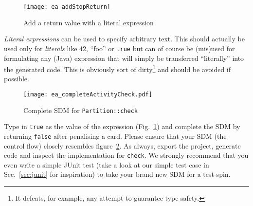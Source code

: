 \begin{figure}[htbp]
\begin{center}
  \texttt{[image: ea\_addStopReturn]}
  \caption{Add a return value with a literal expression}
  \label{fig:sdm_check_literal_exp}
\end{center}
\end{figure}

\emph{Literal expressions} can be used to specify arbitrary text.  This should actually be used only for \emph{literals} like 42, ``foo'' or \texttt{true} but
can of course be (mis)used for formulating any (Java) expression that will simply be transferred ``literally'' into the  generated code.
This is obviously sort of dirty\footnote{It defeats, for example, any attempt to guarantee type safety.} and should be avoided if possible.

\begin{figure}[htbp]
\begin{center}
  \texttt{[image: ea\_completeActivityCheck.pdf]}
  \caption{Complete SDM for \texttt{Partition::check}}
  \label{fig:sdm_check_finish}
\end{center}
\end{figure}

Type in \texttt{true} as the value of the expression (Fig.~\ref{fig:sdm_check_literal_exp}) and complete the SDM by returning \texttt{false} after penalising a
card.  Please ensure that your SDM (the control flow) closely resembles figure~\ref{fig:sdm_check_finish}.
As always, export the project, generate code and inspect the implementation for \texttt{check}.  We strongly recommend that you even write a simple JUnit test
(take a look at our simple test case in Sec.~\ref{sec:junit} for inspiration) to take your brand new SDM for a test-spin.
